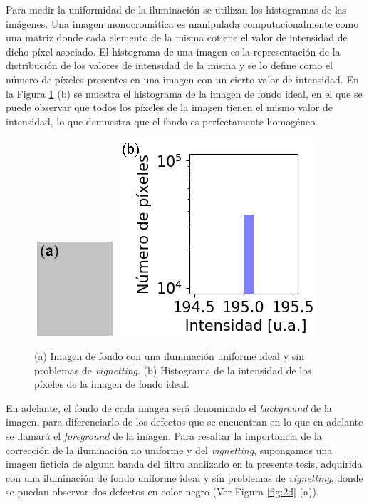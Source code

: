 Para medir la uniformidad de la iluminación se utilizan los histogramas de las imágenes. Una imagen monocromática es manipulada computacionalmente como una matriz donde cada elemento de la misma cotiene el valor de intensidad de dicho píxel asociado. El histograma de una imagen es la representación de la distribución de los valores de intensidad de la misma y se lo define como el número de píxeles presentes en una imagen con un cierto valor de intensidad. En la Figura \ref{fig:fon} (b) se muestra el histograma de la imagen de fondo ideal, en el que se puede observar que todos los píxeles de la imagen tienen el mismo valor de intensidad, lo que demuestra que el fondo es perfectamente homogéneo.

\begin{figure}[H]
\hfill%
\includegraphics[width=3.0cm,height=3.5cm]{Figs/defectosZEISS/bg_teorico.png}
\hfill%
\includegraphics[scale=0.7]{Figs/defectosZEISS/hist_bg_teorico.png}
\hfill%
\hfill%
\caption{(a) Imagen de fondo con una iluminación uniforme ideal y sin problemas de \textit{vignetting}. (b) Histograma de la intensidad de los píxeles de la imagen de fondo ideal.}
\label{fig:fon}
\end{figure}
En adelante, el fondo de cada imagen será denominado el \textit{background} de la imagen, para diferenciarlo de los defectos que se encuentran en lo que en adelante se llamará el \textit{foreground} de la imagen. Para resaltar la importancia de la corrección de la iluminación no uniforme y del \textit{vignetting}, supongamos una imagen ficticia de alguna banda del filtro analizado en la presente tesis, adquirida con una iluminación de fondo uniforme ideal y sin problemas de \textit{vignetting}, donde se puedan observar dos defectos en color negro (Ver Figura \ref{fig:2d} (a)).
